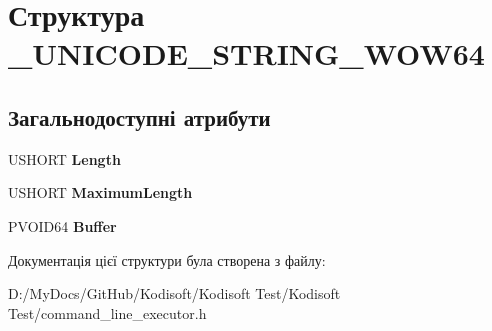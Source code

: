 \hypertarget{struct___u_n_i_c_o_d_e___s_t_r_i_n_g___w_o_w64}{\section{Структура \+\_\+\+U\+N\+I\+C\+O\+D\+E\+\_\+\+S\+T\+R\+I\+N\+G\+\_\+\+W\+O\+W64}
\label{struct___u_n_i_c_o_d_e___s_t_r_i_n_g___w_o_w64}
}
\subsection*{Загальнодоступні атрибути}
\begin{DoxyCompactItemize}
\item 
\hypertarget{struct___u_n_i_c_o_d_e___s_t_r_i_n_g___w_o_w64_a2e067b5bf10223dee38df4b9101b07f9}{U\+S\+H\+O\+R\+T {\bfseries Length}}\label{struct___u_n_i_c_o_d_e___s_t_r_i_n_g___w_o_w64_a2e067b5bf10223dee38df4b9101b07f9}

\item 
\hypertarget{struct___u_n_i_c_o_d_e___s_t_r_i_n_g___w_o_w64_a1849eeba3648f70e29b239fa9fe2ecfb}{U\+S\+H\+O\+R\+T {\bfseries Maximum\+Length}}\label{struct___u_n_i_c_o_d_e___s_t_r_i_n_g___w_o_w64_a1849eeba3648f70e29b239fa9fe2ecfb}

\item 
\hypertarget{struct___u_n_i_c_o_d_e___s_t_r_i_n_g___w_o_w64_a0ba9d9a1e2e45f02879da6b545fa0798}{P\+V\+O\+I\+D64 {\bfseries Buffer}}\label{struct___u_n_i_c_o_d_e___s_t_r_i_n_g___w_o_w64_a0ba9d9a1e2e45f02879da6b545fa0798}

\end{DoxyCompactItemize}


Документація цієї структури була створена з файлу\+:\begin{DoxyCompactItemize}
\item 
D\+:/\+My\+Docs/\+Git\+Hub/\+Kodisoft/\+Kodisoft Test/\+Kodisoft Test/command\+\_\+line\+\_\+executor.\+h\end{DoxyCompactItemize}
